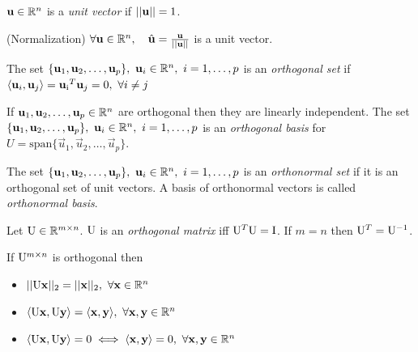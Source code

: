 \begin{definition}
    $\mathbf{u} \in \mathbb{R}^n$ is a \textit{unit vector} if $||\mathbf{u}|| = 1$.
\end{definition}

\begin{proposition}
    (Normalization) $\forall\mathbf{u} \in \mathbb{R}^n,\ \ \ \hat{\mathbf{u}} = \frac{\mathbf{u}}{||\mathbf{u}||}$ is a unit vector.
\end{proposition}



\begin{definition}
    The set $\{\mathbf{u}_1, \mathbf{u}_2, \hdots, \mathbf{u}_p\},\ \mathbf{u}_i \in \mathbb{R}^n,\ i = 1, \hdots, p$ is an \textit{orthogonal set} if $\langle\mathbf{u}_i, \mathbf{u}_j\rangle = \mathrm{\mathbf{u}_i}^T\mathbf{u}_j = 0,\ \forall i \neq j$
\end{definition}



\begin{proposition}
    If $\mathbf{u}_1, \mathbf{u}_2, \hdots, \mathbf{u}_p \in \mathbb{R}^n$ are orthogonal then they are linearly independent. The set $\{\mathbf{u}_1, \mathbf{u}_2, \hdots, \mathbf{u}_p\},\ \mathbf{u}_i \in \mathbb{R}^n,\ i = 1, \hdots, p$ is an \textit{orthogonal basis} for $U = \text{span}\{\vec{u}_1, \vec{u}_2, \hdots, \vec{u}_p\}$.
\end{proposition}

\begin{definition}
    The set $\{\mathbf{u}_1, \mathbf{u}_2, \hdots, \mathbf{u}_p\},\ \mathbf{u}_i \in \mathbb{R}^n,\ i = 1, \hdots, p$ is an \textit{orthonormal set} if it is an orthogonal set of unit vectors. A basis of orthonormal vectors is called \textit{orthonormal basis}.
\end{definition}

\begin{definition}
    Let $\mathrm{U} \in \mathbb{R}^{m \times n}$. $\mathrm{U}$ is an \textit{orthogonal matrix} iff $\mathrm{U}^T\mathrm{U} = \mathrm{I}$. If $m = n$ then $\mathrm{U}^T = \mathrm{U}^{-1}$.
\end{definition}

\begin{proposition}
    If $\mathrm{U}^{m \times n}$ is orthogonal then
    
    \begin{itemize}
        \item $||\mathrm{U}\mathbf{x}||_2 = ||\mathbf{x}||_2,\ \forall\mathbf{x} \in \mathbb{R}^n$
        \item $\langle\mathrm{U}\mathbf{x}, \mathrm{U}\mathbf{y}\rangle = \langle\mathbf{x}, \mathbf{y}\rangle,\ \forall\mathbf{x}, \mathbf{y} \in \mathbb{R}^n$
        \item $\langle\mat{U}\vec{x}, \mat{U}\vec{y}\rangle = 0 \iff \langle\vec{x}, \vec{y}\rangle = 0,\ \forall\vec{x}, \vec{y} \in \set{R}^n$
    \end{itemize}
\end{proposition}

